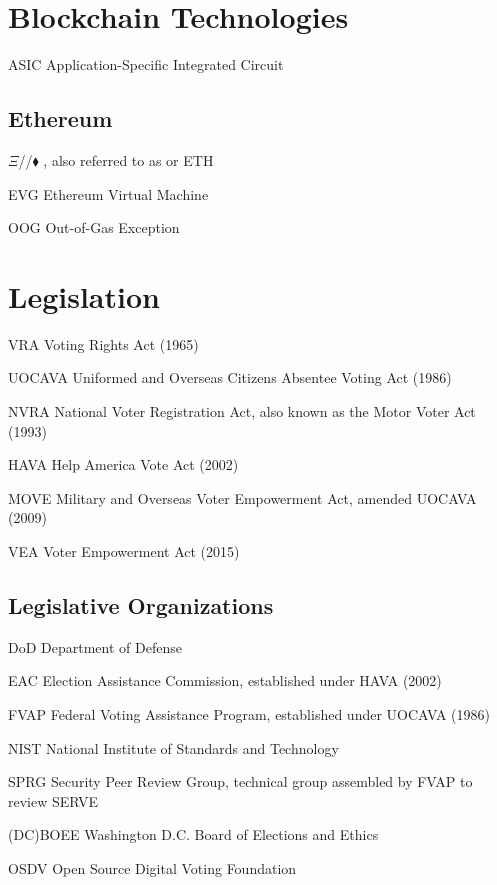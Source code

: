 \section*{Blockchain Technologies}
\begin{symbollist}
	\item[ASIC] Application-Specific Integrated Circuit
\end{symbollist}

\subsection*{Ethereum}
\begin{symbollist}
	\item[$\Xi$/\DH/$\blacklozenge$] , also referred to as  or ETH
	\item[EVG] Ethereum Virtual Machine
	\item[OOG] Out-of-Gas Exception
\end{symbollist}

\section*{Legislation}
\begin{symbollist}
	\item[VRA] Voting Rights Act (1965)
	\item[UOCAVA] Uniformed and Overseas Citizens Absentee Voting Act (1986)
	\item[NVRA] National Voter Registration Act, also known as the Motor Voter Act (1993)
	\item[HAVA] Help America Vote Act (2002)
	\item[MOVE] Military and Overseas Voter Empowerment Act, amended UOCAVA (2009)
	\item[VEA] Voter Empowerment Act (2015)
\end{symbollist}

\subsection*{Legislative Organizations}
\begin{symbollist}
	\item[DoD] Department of Defense
	\item[EAC] Election Assistance Commission, established under HAVA (2002)
	\item[FVAP] Federal Voting Assistance Program, established under UOCAVA (1986)
	\item[NIST] National Institute of Standards and Technology
	\item[SPRG] Security Peer Review Group, technical group assembled by FVAP to review SERVE
	\item[(DC)BOEE] Washington D.C. Board of Elections and Ethics
	\item[OSDV] Open Source Digital Voting Foundation
\end{symbollist}

